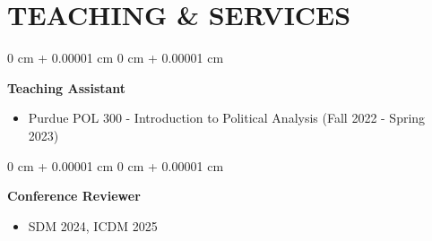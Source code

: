 \documentclass[10pt, letterpaper]{article}
\newenvironment{highlights}{
    \begin{itemize}[
        topsep=0.10 cm,
        parsep=0.10 cm,
        partopsep=0pt,
        itemsep=0pt,
        leftmargin=0 cm + 10pt
    ]
}{
    \end{itemize}
} %
\newenvironment{onecolentry}{
    \begin{adjustwidth}{
        0 cm + 0.00001 cm
    }{
        0 cm + 0.00001 cm
    }
}{
    \end{adjustwidth}
} %
\begin{document}
\vspace{0.10 cm}















    \section{TEACHING \& SERVICES}
    
    \begin{onecolentry}
    \textbf{Teaching Assistant} 
    \begin{highlights}
    \item Purdue POL 300 - Introduction to Political Analysis (Fall 2022 - Spring 2023)
    \end{highlights}
    \end{onecolentry}

    \vspace{0.2 cm}
    
    \begin{onecolentry}
    \textbf{Conference Reviewer}
    \begin{highlights}
    \item SDM 2024, ICDM 2025
    \end{highlights}
    \end{onecolentry}
    



\end{document}
